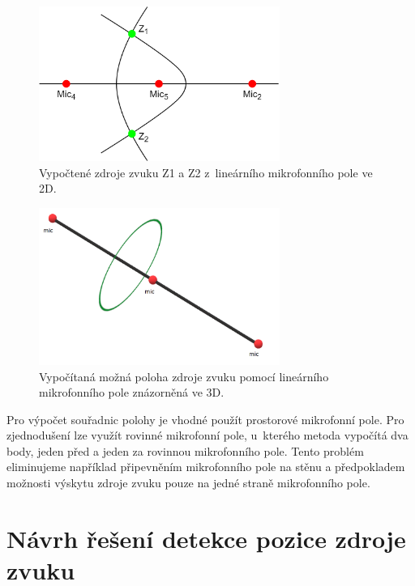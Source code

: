 \begin{figure}[hbt]
	\centering
	\includegraphics[width=0.7\textwidth]{obrazky-figures/TDOA_hyperboly.png}
	\caption{Vypočtené zdroje zvuku Z1 a Z2 z~lineárního mikrofonního pole ve 2D.}
	\label{pic:TDOA1}
\end{figure}

\begin{figure}[hbt]
	\centering
	\includegraphics[width=0.7\textwidth]{obrazky-figures/TDOA_kruh.png}
	\caption{Vypočítaná možná poloha zdroje zvuku pomocí lineárního mikrofonního pole znázorněná ve 3D.}
	\label{pic:TDOA2}
\end{figure}

\newpage

Pro výpočet souřadnic polohy je vhodné použít prostorové mikrofonní pole. Pro zjednodušení lze využít rovinné mikrofonní pole, u~kterého metoda vypočítá dva body, jeden před a jeden za rovinnou mikrofonního pole. Tento problém eliminujeme například připevněním mikrofonního pole na stěnu a předpokladem možnosti výskytu zdroje zvuku pouze na jedné straně mikrofonního pole.

\chapter{Návrh řešení detekce pozice zdroje zvuku} 
\label{Návrh}


